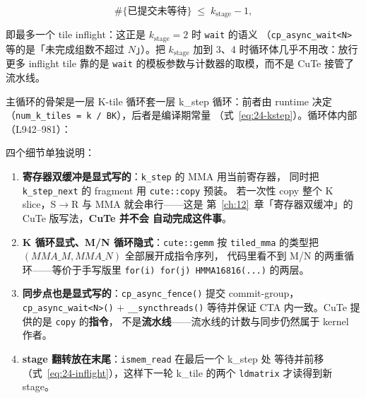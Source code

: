\begin{equation}
  \#\{\text{已提交未等待}\} \;\le\; k_{\mathrm{stage}}-1 ,
  \label{eq:24-inflight}
\end{equation}

即最多一个 tile inflight：这正是 $k_{\mathrm{stage}}=2$ 时 \texttt{wait} 的语义
（\texttt{cp\_\allowbreak{}async\_\allowbreak{}wait\allowbreak{}<N>} 等的是「未完成组数不超过 $N$」）。把
$k_{\mathrm{stage}}$ 加到 3、4 时循环体几乎不用改：放行更多 inflight tile 靠的是
\texttt{wait} 的模板参数与计数器的取模，而不是 CuTe 接管了流水线。

主循环的骨架是一层 K-tile 循环套一层 k\_step 循环：前者由 runtime 决定
（\texttt{num\_k\_tiles = k / BK}），后者是编译期常量
（式~\eqref{eq:24-kstep}）。循环体内部（L942--981）：



四个细节单独说明：

\begin{enumerate}
  \item \textbf{寄存器双缓冲是显式写的}：\texttt{k\_step} 的 MMA 用当前寄存器，
        同时把 \texttt{k\_step\_next} 的 fragment 用 \texttt{cute::copy} 预装。
        若一次性 copy 整个 K slice，S$\to$R 与 MMA 就会串行——这是
        第~\ref{ch:12}~章「寄存器双缓冲」的 CuTe 版写法，\textbf{CuTe 并不会
        自动完成这件事}。
  \item \textbf{K 循环显式、M/N 循环隐式}：\texttt{cute::gemm} 按
        \texttt{tiled\_mma} 的类型把 $(MMA\_M, MMA\_N)$ 全部展开成指令序列，
        代码里看不到 M/N 的两重循环——等价于手写版里
        \texttt{for\allowbreak{}(i)\ for\allowbreak{}(j)\ HMMA16816\allowbreak{}(.\allowbreak{}.\allowbreak{}.\allowbreak{})} 的两层。
  \item \textbf{同步点也是显式写的}：\texttt{cp\_\allowbreak{}async\_\allowbreak{}fence\allowbreak{}()} 提交
        commit-group，\texttt{cp\_\allowbreak{}async\_\allowbreak{}wait\allowbreak{}<N>\allowbreak{}()} $+$ \texttt{\_\allowbreak{}\_\allowbreak{}syncthreads\allowbreak{}()}
        等待并保证 CTA 内一致。CuTe 提供的是 \texttt{copy} 的\textbf{指令}，
        不是\textbf{流水线}——流水线的计数与同步仍然属于 kernel 作者。
  \item \textbf{stage 翻转放在末尾}：\texttt{ismem\_read} 在最后一个 k\_step 处
        等待并前移（式~\eqref{eq:24-inflight}），这样下一轮 k\_tile 的两个
        \texttt{ldmatrix} 才读得到新 stage。
\end{enumerate}

